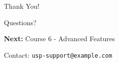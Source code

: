 \documentclass{beamer}
\begin{document}
\begin{frame}[plain]
\begin{center}
\Huge Thank You!

\vspace{1cm}

\Large Questions?

\vspace{1cm}

\normalsize
\textbf{Next:} Course 6 - Advanced Features

\vspace{0.5cm}

Contact: \texttt{usp-support@example.com}
\end{center}
\end{frame}
\end{document}
